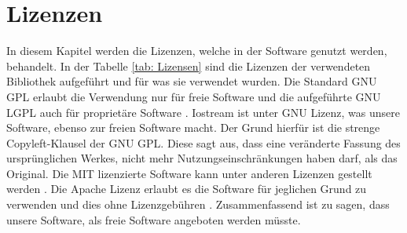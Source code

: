 \section{Lizenzen}
In diesem Kapitel werden die Lizenzen, welche in der Software genutzt werden, behandelt. In der Tabelle \ref{tab: Lizensen} sind die Lizenzen der verwendeten Bibliothek aufgeführt und für was sie verwendet wurden. Die Standard GNU GPL erlaubt die Verwendung nur für freie Software und die aufgeführte GNU LGPL auch für proprietäre Software \cite{noauthor_gnuorg_nodate}. Iostream ist unter GNU Lizenz, was unsere Software, ebenso zur freien Software macht. Der Grund hierfür ist die strenge Copyleft-Klausel der GNU GPL. Diese sagt aus, dass eine veränderte Fassung des ursprünglichen Werkes, nicht mehr Nutzungseinschränkungen haben darf, als das Original.\cite{noauthor_copyleft_2020} Die MIT lizenzierte Software kann  unter anderen Lizenzen gestellt werden \cite{noauthor_mit_2020}. Die Apache Lizenz erlaubt es die Software für jeglichen Grund zu verwenden und dies ohne Lizenzgebühren \cite{noauthor_apache_2020}. Zusammenfassend ist zu sagen, dass unsere Software, als freie Software angeboten werden müsste.

